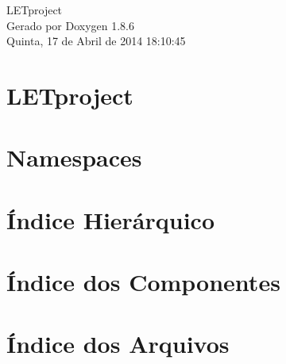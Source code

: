 \documentclass[twoside]{book}
\newcommand{\clearemptydoublepage}{%
  \newpage{\pagestyle{empty}\cleardoublepage}%
}
\begin{document}
\hypersetup{pageanchor=false}
\begin{titlepage}
\vspace*{7cm}
\begin{center}%
{\Large L\-E\-Tproject }\\
\vspace*{1cm}
{\large Gerado por Doxygen 1.8.6}\\
\vspace*{0.5cm}
{\small Quinta, 17 de Abril de 2014 18:10:45}\\
\end{center}
\end{titlepage}
\clearemptydoublepage
\tableofcontents
\clearemptydoublepage
{}
\hypersetup{pageanchor=true}

\chapter{L\-E\-Tproject}
\label{d0/d30/md_README}
\hypertarget{d0/d30/md_README}{}

\chapter{Namespaces}

\chapter{Índice Hierárquico}

\chapter{Índice dos Componentes}

\chapter{Índice dos Arquivos}

\end{document}
